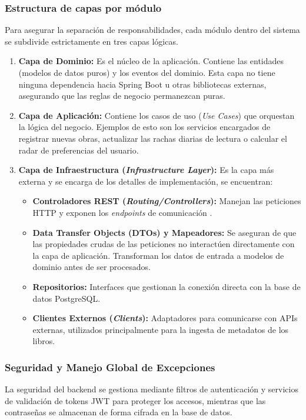 \documentclass[12pt, atypical, journal]{article}
\begin{document}
\subsubsection{Estructura de capas por módulo}
Para asegurar la separación de responsabilidades, cada módulo dentro del sistema se subdivide estrictamente en tres capas lógicas.

\begin{enumerate}
    \item \textbf{Capa de Dominio:} Es el núcleo de la aplicación. Contiene las entidades (modelos de datos puros) y los eventos del dominio. Esta capa no tiene ninguna dependencia hacia Spring Boot u otras bibliotecas externas, asegurando que las reglas de negocio permanezcan puras.
    
    \item \textbf{Capa de Aplicación:} Contiene los casos de uso (\textit{Use Cases}) que orquestan la lógica del negocio. Ejemplos de esto son los servicios encargados de registrar nuevas obras, actualizar las rachas diarias de lectura o calcular el radar de preferencias del usuario.
    
    \item \textbf{Capa de Infraestructura (\textit{Infrastructure Layer}):} Es la capa más externa y se encarga de los detalles de implementación, se encuentran: 
    \begin{itemize}
        \item \textbf{Controladores REST (\textit{Routing/Controllers}):} Manejan las peticiones HTTP y exponen los \textit{endpoints} de comunicación .
        \item \textbf{Data Transfer Objects (DTOs) y Mapeadores:} Se aseguran de que las propiedades crudas de las peticiones no interactúen directamente con la capa de aplicación. Transforman los datos de entrada a modelos de dominio antes de ser procesados.
        \item \textbf{Repositorios:} Interfaces que gestionan la conexión directa con la base de datos PostgreSQL.
        \item \textbf{Clientes Externos (\textit{Clients}):} Adaptadores para comunicarse con APIs externas, utilizados principalmente para la ingesta de metadatos de los libros.
    \end{itemize}
\end{enumerate}

\subsubsection{Seguridad y Manejo Global de Excepciones}
La seguridad del backend se gestiona mediante filtros de autenticación y servicios de validación de tokens JWT para proteger los accesos, mientras que las contraseñas se almacenan de forma cifrada en la base de datos.
\end{document}
